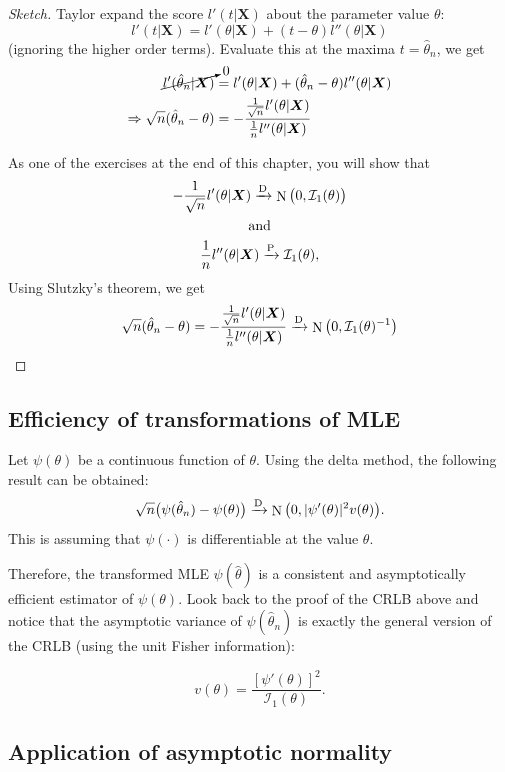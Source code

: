 \documentclass[
]{book}
\newcommand{\bX}{{\boldsymbol X}}
\DeclareMathOperator{\N}{N}
\newcommand{\cI}{{\mathcal I}}
\theoremstyle{definition}
\theoremstyle{definition}
\theoremstyle{definition}
\theoremstyle{definition}
\theoremstyle{remark}
\begin{document}
\begin{proof}[Sketch]
Taylor expand the score \(l'(t|\bX)\) about the parameter value \(\theta\):
\[
l'(t|\bX) = l'(\theta|\bX) + (t - \theta)l''(\theta|\bX) 
\]
(ignoring the higher order terms). Evaluate this at the maxima \(t=\hat\theta_n\), we get
\begin{align*}
\cancelto{0}{l'(\hat\theta_n|\bX)} &= l'(\theta|\bX) + (\hat\theta_n - \theta)l''(\theta|\bX) \\
\Rightarrow \sqrt n(\hat\theta_n - \theta) &= -\frac{\frac{1}{\sqrt n}l'(\theta|\bX)}{\frac{1}{n}l''(\theta|\bX)}
\end{align*}

As one of the exercises at the end of this chapter, you will show that
\begin{gather*}
-\frac{1}{\sqrt n}l'(\theta|\bX) \xrightarrow{\text D} \N\big(0,\cI_1(\theta)\big)\\
\text{and}\\
\frac{1}{n}l''(\theta|\bX) \xrightarrow{\text P} \cI_1(\theta),
\end{gather*}
Using Slutzky's theorem, we get
\[
\sqrt n(\hat\theta_n - \theta) = -\frac{\frac{1}{\sqrt n}l'(\theta|\bX)}{\frac{1}{n}l''(\theta|\bX)} \xrightarrow{\text D} \N\big(0,\cI_1(\theta)^{-1}\big)
\]
\end{proof}

\hypertarget{efficiency-of-transformations-of-mle}{%
\subsection{Efficiency of transformations of MLE}\label{efficiency-of-transformations-of-mle}}

Let \(\psi(\theta)\) be a continuous function of \(\theta\).
Using the delta method, the following result can be obtained:
\[
\sqrt n \big(\psi(\hat\theta_n) - \psi(\theta)\big) \xrightarrow{\text D} \N\big(0, |\psi'(\theta)|^2v(\theta)\big).
\]
This is assuming that \(\psi(\cdot)\) is differentiable at the value \(\theta\).

Therefore, the transformed MLE \(\psi(\hat\theta)\) is a consistent and asymptotically efficient estimator of \(\psi(\theta)\).
Look back to the proof of the CRLB above and notice that the asymptotic variance of \(\psi(\hat\theta_n)\) is exactly the general version of the CRLB (using the unit Fisher information):

\[
v(\theta) = \frac{\left[\psi'(\theta) \right]^2}{\cI_1(\theta)}.
\]

\hypertarget{application-of-asymptotic-normality}{%
\subsection{Application of asymptotic normality}\label{application-of-asymptotic-normality}}
\end{document}

